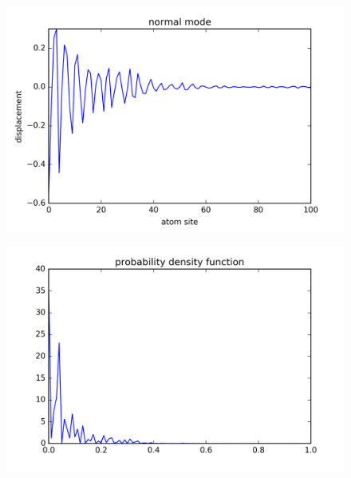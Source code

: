 \begin{figure}[!htbh]
\centering
\begin{minipage}{.45\textwidth}
  \centering
  \includegraphics[width=1.1\linewidth]{Harmonic_spring_ratio/spr_N_103sp_2p_0_551th.png}
  \label{fig:spring normal mode mid range frequency}
\end{minipage}\qquad
\begin{minipage}{.45\textwidth}
  \centering
  \includegraphics[width=1.1\linewidth]{Harmonic_spring_ratio/densProb_0_5N_103m_2p_51th.png}
  \label{fig:spring prob density mid range frequency}
\end{minipage}
\end{figure}

